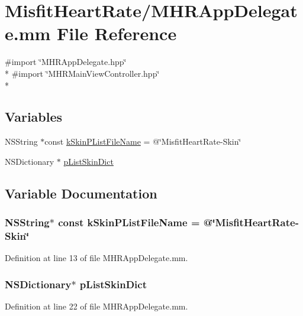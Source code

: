 \hypertarget{_m_h_r_app_delegate_8mm}{\section{Misfit\+Heart\+Rate/\+M\+H\+R\+App\+Delegate.mm File Reference}
\label{_m_h_r_app_delegate_8mm}
}
{\ttfamily \#import \char`\"{}M\+H\+R\+App\+Delegate.\+hpp\char`\"{}}\\*
{\ttfamily \#import \char`\"{}M\+H\+R\+Main\+View\+Controller.\+hpp\char`\"{}}\\*
\subsection*{Variables}
\begin{DoxyCompactItemize}
\item 
N\+S\+String $\ast$const \hyperlink{_m_h_r_app_delegate_8mm_a9a37d4720545212bc71afc310ca8f7c4}{k\+Skin\+P\+List\+File\+Name} = @\char`\"{}Misfit\+Heart\+Rate-\/Skin\char`\"{}
\item 
N\+S\+Dictionary $\ast$ \hyperlink{_m_h_r_app_delegate_8mm_a410f9d5fa42ffb700da1838a7ad0902e}{p\+List\+Skin\+Dict}
\end{DoxyCompactItemize}


\subsection{Variable Documentation}
\hypertarget{_m_h_r_app_delegate_8mm_a9a37d4720545212bc71afc310ca8f7c4}{
\subsubsection[{k\+Skin\+P\+List\+File\+Name}]{\setlength{\rightskip}{0pt plus 5cm}N\+S\+String$\ast$ const k\+Skin\+P\+List\+File\+Name = @\char`\"{}Misfit\+Heart\+Rate-\/Skin\char`\"{}}}\label{_m_h_r_app_delegate_8mm_a9a37d4720545212bc71afc310ca8f7c4}


Definition at line 13 of file M\+H\+R\+App\+Delegate.\+mm.

\hypertarget{_m_h_r_app_delegate_8mm_a410f9d5fa42ffb700da1838a7ad0902e}{
\subsubsection[{p\+List\+Skin\+Dict}]{\setlength{\rightskip}{0pt plus 5cm}N\+S\+Dictionary$\ast$ p\+List\+Skin\+Dict}}\label{_m_h_r_app_delegate_8mm_a410f9d5fa42ffb700da1838a7ad0902e}


Definition at line 22 of file M\+H\+R\+App\+Delegate.\+mm.

